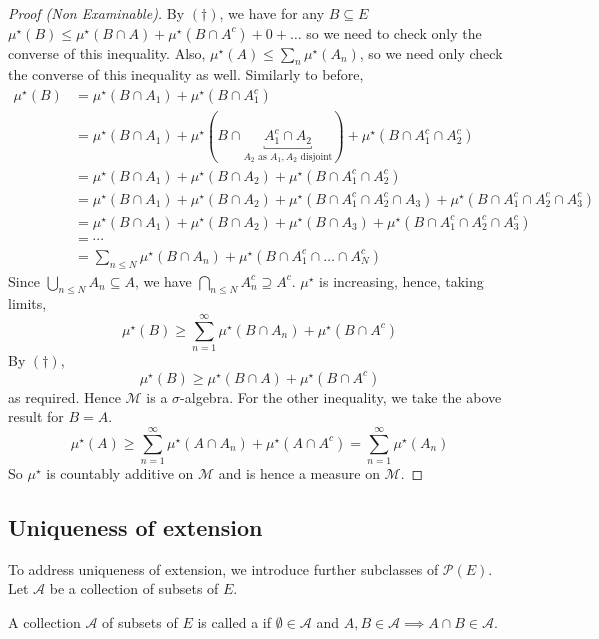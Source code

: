 \begin{proof}[Proof (Non Examinable)]
	By $(\dagger)$, we have for any $B \subseteq E$ $\mu^\star(B) \leq \mu^\star(B \cap A) + \mu^\star(B \cap A^c) + 0 + \dots$ so we need to check only the converse of this inequality.
	Also, $\mu^\star(A) \leq \sum_n \mu^\star(A_n)$, so we need only check the converse of this inequality as well.
	Similarly to before,
	\begin{align*}
		\mu^\star(B) &= \mu^\star(B \cap A_1) + \mu^\star(B \cap A_1^c) \\
		&= \mu^\star(B \cap A_1) + \mu^\star(B \cap \underbracket{A_1^c \cap A_2}_{A_2 \text{ as $A_1, A_2$ disjoint}}) + \mu^\star(B \cap A_1^c \cap A_2^c) \\
		&= \mu^\star(B \cap A_1) + \mu^\star(B \cap A_2) + \mu^\star(B \cap A_1^c \cap A_2^c) \\
		&= \mu^\star(B \cap A_1) + \mu^\star(B \cap A_2) + \mu^\star(B \cap A_1^c \cap A_2^c \cap A_3) + \mu^\star(B \cap A_1^c \cap A_2^c \cap A_3^c) \\
		&= \mu^\star(B \cap A_1) + \mu^\star(B \cap A_2) + \mu^\star(B \cap A_3) + \mu^\star(B \cap A_1^c \cap A_2^c \cap A_3^c) \\
		&= \cdots \\
		&= \sum_{n \leq N} \mu^\star(B \cap A_n) + \mu^\star(B \cap A_1^c \cap \dots \cap A_N^c)
	\end{align*}
	Since $\bigcup_{n \leq N} A_n \subseteq A$, we have $\bigcap_{n \leq N} A_n^c \supseteq A^c$.
	$\mu^\star$ is increasing, hence, taking limits,
	\[ \mu^\star(B) \geq \sum_{n=1}^\infty \mu^\star(B \cap A_n) + \mu^\star(B \cap A^c) \]
	By $(\dagger)$,
	\[ \mu^\star(B) \geq \mu^\star(B \cap A) + \mu^\star(B \cap A^c) \]
	as required.
	Hence $\mathcal M$ is a $\sigma$-algebra.
	For the other inequality, we take the above result for $B = A$.
	\[ \mu^\star(A) \geq \sum_{n=1}^\infty \mu^\star(A \cap A_n) + \mu^\star(A \cap A^c) = \sum_{n=1}^\infty \mu^\star(A_n) \]
	So $\mu^\star$ is countably additive on $\mathcal M$ and is hence a measure on $\mathcal M$.
\end{proof}

\subsection{Uniqueness of extension}
To address uniqueness of extension, we introduce further subclasses of $\mathcal{P}(E)$. Let $\mathcal{A}$ be a collection of subsets of $E$.

\begin{definition}[$\pi$-system]
	A collection $\mathcal A$ of subsets of $E$ is called a  if $\emptyset \in \mathcal A$ and $A, B \in \mathcal A \implies A \cap B \in \mathcal A$.
\end{definition}

